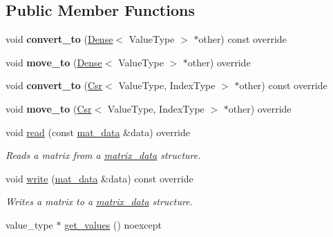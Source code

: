 \subsection*{Public Member Functions}
\begin{DoxyCompactItemize}
\item 
\mbox{\label{classgko_1_1matrix_1_1Ell_ac7ffdfa4fa0b75b47f49a1373995c1c8}} 
void {\bfseries convert\+\_\+to} (\hyperlink{classgko_1_1matrix_1_1Dense}{Dense}$<$ Value\+Type $>$ $\ast$other) const override
\item 
\mbox{\label{classgko_1_1matrix_1_1Ell_aafff71fa45b090208cb6fa29ba495d37}} 
void {\bfseries move\+\_\+to} (\hyperlink{classgko_1_1matrix_1_1Dense}{Dense}$<$ Value\+Type $>$ $\ast$other) override
\item 
\mbox{\label{classgko_1_1matrix_1_1Ell_aa54a287350e098bd1e5f3b243c2ad0d9}} 
void {\bfseries convert\+\_\+to} (\hyperlink{classgko_1_1matrix_1_1Csr}{Csr}$<$ Value\+Type, Index\+Type $>$ $\ast$other) const override
\item 
\mbox{\label{classgko_1_1matrix_1_1Ell_a5d2394c6dfe5568e6e82ab84fc779c40}} 
void {\bfseries move\+\_\+to} (\hyperlink{classgko_1_1matrix_1_1Csr}{Csr}$<$ Value\+Type, Index\+Type $>$ $\ast$other) override
\item 
void \hyperlink{classgko_1_1matrix_1_1Ell_a2c877d9f7bbc57f97df5ab443954a6fd}{read} (const \hyperlink{structgko_1_1matrix__data}{mat\+\_\+data} \&data) override
\begin{DoxyCompactList}\small\item\em Reads a matrix from a \hyperlink{structgko_1_1matrix__data}{matrix\+\_\+data} structure. \end{DoxyCompactList}\item 
void \hyperlink{classgko_1_1matrix_1_1Ell_afa9148a16a9255003055d8e9156ee941}{write} (\hyperlink{structgko_1_1matrix__data}{mat\+\_\+data} \&data) const override
\begin{DoxyCompactList}\small\item\em Writes a matrix to a \hyperlink{structgko_1_1matrix__data}{matrix\+\_\+data} structure. \end{DoxyCompactList}\item 
value\+\_\+type $\ast$ \hyperlink{classgko_1_1matrix_1_1Ell_a4028e9629a7d96a7a483e6ea4a686a1d}{get\+\_\+values} () noexcept

\end{DoxyCompactItemize}
